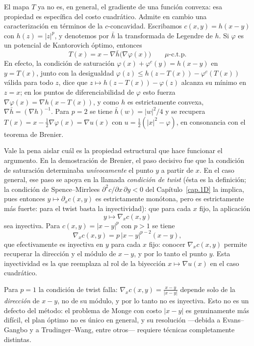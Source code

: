 \documentclass[12pt, a4paper]{amsbook}
\theoremstyle{remark}
\theoremstyle{definition}
\numberwithin{section}{chapter}
\numberwithin{subsection}{section}
\numberwithin{equation}{section}
\numberwithin{figure}{chapter}
\begin{document}
El mapa $T$ ya no es, en general, el gradiente de una función convexa: esa
propiedad es específica del costo cuadrático. Admite en cambio una
caracterización en términos de la $c$-concavidad. Escribamos $c(x,y)=h(x-y)$
con $h(z)=|z|^p$, y denotemos por $\bar h$ la transformada de Legendre de $h$.
Si $\varphi$ es un potencial de Kantorovich óptimo, entonces
\[
T(x)=x-\nabla\bar h\bigl(\nabla\varphi(x)\bigr)
\qquad
\mu\text{-c.t.p.}
\]
En efecto, la condición de saturación $\varphi(x)+\varphi^c(y)=h(x-y)$ en
$y=T(x)$, junto con la desigualdad $\varphi(z)\le h(z-T(x))-\varphi^c(T(x))$
válida para todo $z$, dice que $z\mapsto h(z-T(x))-\varphi(z)$ alcanza su
mínimo en $z=x$; en los puntos de diferenciabilidad de $\varphi$ esto fuerza
$\nabla\varphi(x)=\nabla h(x-T(x))$, y como $h$ es estrictamente convexa,
$\nabla\bar h=(\nabla h)^{-1}$. Para $p=2$ se tiene $\bar h(w)=|w|^2/4$ y
se recupera $T(x)=x-\tfrac12\nabla\varphi(x)=\nabla u(x)$ con
$u=\tfrac12(|x|^2-\varphi)$, en consonancia con el teorema de Brenier.

Vale la pena aislar cuál es la propiedad estructural que hace funcionar el
argumento. En la demostración de Brenier, el paso decisivo fue que la condición
de saturación determinaba \emph{unívocamente} el punto $y$ a partir de $x$. En
el caso general, ese paso se apoya en la llamada \emph{condición de twist}
(ésta es la definición; la condición de
Spence--Mirrlees $\partial^2c/\partial x\,\partial y<0$ del
Capítulo~\ref{cap.1D} la implica, pues entonces $y\mapsto\partial_xc(x,y)$ es
estrictamente monótona, pero es estrictamente más fuerte: para el twist basta
la inyectividad): que
para cada $x$ fijo, la aplicación
\[
y\longmapsto\nabla_xc(x,y)
\]
sea inyectiva. Para $c(x,y)=|x-y|^p$ con $p>1$ se tiene
\[
\nabla_xc(x,y)=p\,|x-y|^{p-2}(x-y),
\]
que efectivamente es inyectiva en $y$ para cada $x$ fijo: conocer
$\nabla_xc(x,y)$ permite recuperar la dirección y el módulo de $x-y$, y por lo
tanto el punto $y$. Esta inyectividad es la que reemplaza al rol de la
biyección $x\mapsto\nabla u(x)$ en el caso cuadrático.

Para $p=1$ la condición de twist falla: $\nabla_xc(x,y)=\tfrac{x-y}{|x-y|}$
depende solo de la \emph{dirección} de $x-y$, no de su módulo, y por lo tanto no
es inyectiva. Esto no es un defecto del método: el problema de Monge con costo
$|x-y|$ es genuinamente más difícil, el plan óptimo no es único en general, y su
resolución —debida a Evans--Gangbo y a Trudinger--Wang, entre otros— requiere
técnicas completamente distintas.

\end{document}
